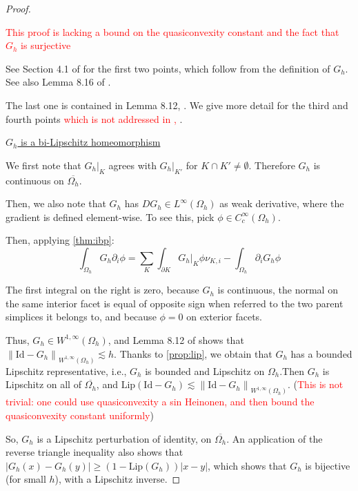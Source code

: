 \documentclass[english,a4paper,10pt,oneside]{scrbook}	%
\theoremstyle{break}
\newenvironment{mproof}[1][\proofname]{%
  \begin{proof}[#1]$ $\par\nobreak\ignorespaces
}{%
  \end{proof}
}
\renewcommand*{\proofname}{Proof}
\theoremstyle{remark}
\newcommand{\norm}[1]{\left\lVert#1\right\rVert}
\newcommand{\id}{\text{Id}}
\begin{document}
\begin{mproof}

\textcolor{red}{This proof is lacking a bound on the quasiconvexity constant and the fact that $G_h$ is surjective}

See Section 4.1 of \cite{elliott} for the first two points, which follow from the definition of $G_h$. See also Lemma 8.16 of \cite{ranner}.

The last one is contained in Lemma 8.12, \cite{ranner}. We give more detail for the third and fourth points \textcolor{red}{which is not addressed in \cite{ranner}, \cite{elliott}}.

\underline{$G_h$ is a bi-Lipschitz homeomorphism}

We first note that $G_h|_K$ agrees with $G_h|_{K'}$ for $K\cap K' \neq \emptyset$. Therefore $G_h$ is continuous on $\overline{\Omega_h}$.

Then, we also note that $G_h$ has $DG_h \in L^\infty(\Omega_h)$ as weak derivative, where the gradient is defined element-wise. To see this, pick $\phi \in C^\infty_c(\Omega_h)$.

Then, applying \cref{thm:ibp}:
$$\int_{\Omega_h} G_h \partial_i \phi = \sum_K \int_{\partial K}G_h|_{K} \phi \nu_{K,i}  - \int_{\Omega_h}\partial_i G_h \phi$$

The first integral on the right is zero, because $G_h$ is continuous, the normal on the same interior facet is equal of opposite sign when referred to the two parent simplices it belongs to, and because $\phi=0$ on exterior facets.

Thus, $G_h \in W^{1,\infty}(\Omega_h)$, and Lemma 8.12 of \cite{ranner} shows that $\norm{\id -G_h}_{W^{1,\infty}(\Omega_h)}\lesssim h$. Thanks to \cref{prop:lip}, we obtain that $G_h$ has a bounded Lipschitz representative, i.e., $G_h$ is bounded and Lipschitz on $\Omega_h$.Then $G_h$ is Lipschitz on all of $\overline{\Omega_h}$, and $\text{Lip}(\id -G_h) \lesssim  \norm{\id -G_h}_{W^{1,\infty}(\Omega_h)}$. (\textcolor{red}{This is not trivial: one could use quasiconvexity a sin Heinonen, and then bound the quasiconvexity constant uniformly})

So, $G_h$ is a Lipschitz perturbation of identity, on $\overline{\Omega_h}$.  An application of the reverse triangle inequality also shows that $|G_h(x)-G_h(y)|\geq (1-\text{Lip}(G_h))|x-y|$, which shows that $G_h$ is bijective (for small $h$), with a Lipschitz inverse.




\end{mproof}
\end{document}
